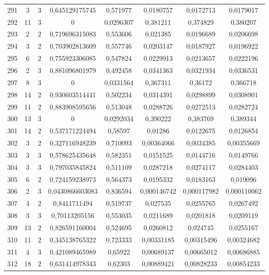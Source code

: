 \begin{longtable}{|c|c|c|c|c|c|c|c|}
291 & 3 & 3 & 0,645129175745 & 0,571977 & 0,0180757 & 0,0172713 & 0,0179017  \\
292 & 11 & 3 & 0 & 0,0296307 & 0,381211 & 0,374829 & 0,380207  \\
293 & 2 & 2 & 0,719696315083 & 0,553606 & 0,021385 & 0,0196689 & 0,0206698  \\
294 & 3 & 2 & 0,703902813609 & 0,557746 & 0,0203147 & 0,0187927 & 0,0196922  \\
295 & 6 & 2 & 0,755923306085 & 0,547824 & 0,0229913 & 0,0213657 & 0,0222196  \\
296 & 2 & 3 & 0,881096801979 & 0,492458 & 0,0341363 & 0,0321934 & 0,0336531  \\
297 & 8 & 3 & 0 & 0,0331564 & 0,367311 & 0,36172 & 0,366718  \\
298 & 14 & 2 & 0,930603514441 & 0,502234 & 0,0314391 & 0,0298899 & 0,0308901  \\
299 & 11 & 2 & 0,883908595656 & 0,513048 & 0,0288726 & 0,0272513 & 0,0282724  \\
300 & 13 & 3 & 0 & 0,0292034 & 0,390222 & 0,383769 & 0,389344  \\
301 & 14 & 2 & 0,537171224494 & 0,58597 & 0,01286 & 0,0122675 & 0,0126854  \\
302 & 3 & 2 & 0,327116948239 & 0,710093 & 0,00364066 & 0,0034385 & 0,00355669  \\
303 & 3 & 3 & 0,578625435648 & 0,582351 & 0,0151525 & 0,0144716 & 0,0149766  \\
304 & 3 & 3 & 0,797035845824 & 0,511109 & 0,0287218 & 0,0274117 & 0,0284403  \\
305 & 6 & 2 & 0,724159238973 & 0,564373 & 0,0195332 & 0,0183163 & 0,019096  \\
306 & 2 & 3 & 0,0430866603083 & 0,836594 & 0,000146742 & 0,000117982 & 0,000110062  \\
307 & 4 & 2 & 0,8411711494 & 0,519737 & 0,027535 & 0,0255765 & 0,0267492  \\
308 & 3 & 3 & 0,70113205156 & 0,553035 & 0,0211689 & 0,0201818 & 0,0209119  \\
309 & 13 & 2 & 0,826591160004 & 0,524695 & 0,0260812 & 0,024745 & 0,0255167  \\
310 & 11 & 2 & 0,345138765322 & 0,723333 & 0,00331185 & 0,00315496 & 0,00324682  \\
311 & 4 & 3 & 0,421089465989 & 0,65922 & 0,00689137 & 0,00665012 & 0,00686885  \\
312 & 18 & 2 & 0,631414978343 & 0,62303 & 0,00889421 & 0,00828233 & 0,00854233  \\

\end{longtable}
